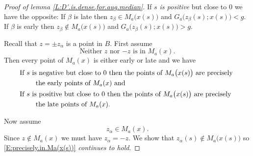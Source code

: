 \documentclass[10pt,a4paper]{amsart}
\begin{document}
\begin{proof}[Proof of lemma \ref{L:D'.is.dense.for.aug.median}]
If \emph{$s$ is positive} but close to 0 we have the opposite: If $\beta$ is late then $z_{\beta} \in M_{a} \bigl( x(s) \bigr)$ and 
$G_{a} \bigl( z_{\beta}(s); x(s) \bigr) < g$. If $\beta$ is early then 
$z_{\beta} \notin M_{a} \bigl( x(s) \bigr)$ and 
$G_{a} \bigl( z_{\beta}(s); x(s) \bigr) > g$. 

Recall that $z = \pm z_{\alpha}$ is a point in $B$. First assume 
    \begin{equation*}
      \text{Neither $z$ nor $-z$ is in } M_{a}(x). 
    \end{equation*}
Then every point of $M_{a}(x)$ is either early or late and we have
    \begin{align} \label{E:precisely.in.Ma(x(s))}
      &\text{If $s$ is negative but close to 0 then the points of  } \notag
        M_{a} \bigl( x(s) \bigr) \text{ are precisely } \\ 
      & \qquad \text{ the early points of $M_{a}(x)$ and } \\
      &\text{If $s$ is positive but close to 0 then the points of  } \notag
        M_{a} \bigl( x(s) \bigr) \text{ are precisely } \\ \notag
      & \qquad \text{ the late points of $M_{a}(x)$. } \notag
    \end{align}

Now assume 
    \begin{equation*}
      z_{\alpha} \in M_{a}(x).
    \end{equation*}
Since $z \notin M_{a}(x)$ we must have $z_{\alpha} = -z$. We show that 
$z_{\alpha}(s) \notin M_{a} \bigl( x(s) \bigr)$ so 
\eqref{E:precisely.in.Ma(x(s))} \emph{continues to hold}.


\end{proof}
\end{document}
